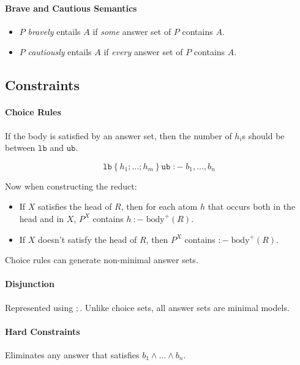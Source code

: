 \documentclass[twocolumn,english]{article}
\begin{document}
\paragraph{Brave and Cautious Semantics}
\begin{itemize}
\item $P$ \emph{bravely} entails $A$ if \emph{some} answer set of $P$
contains $A$.
\item $P$ \emph{cautiously} entails $A$ if \emph{every} answer set of
$P$ contains $A$.
\end{itemize}

\subsection{Constraints}

\paragraph{Choice Rules}

If the body is satisfied by an answer set, then the number of $h_{i}$s
should be between $\mathtt{lb}$ and $\mathtt{ub}$.

\[
\mathtt{lb}\left\{ h_{1};\dots;h_{m}\right\} \mathtt{ub}\;:-\;b_{1},\dots,b_{n}
\]

Now when constructing the reduct:
\begin{itemize}
\item If $X$ satisfies the head of $R$, then for each atom $h$ that occurs
both in the head and in $X$, $P^{X}$ contains $h\::-\;\text{body}^{+}\left(R\right)$.
\item If $X$ doesn't satisfy the head of $R$, then $P^{X}$ contains $:-\;\text{body}^{+}\left(R\right)$.
\end{itemize}
Choice rules can generate non-minimal answer sets.

\paragraph{Disjunction}

Represented using $;$. Unlike choice sets, all answer sets are minimal
models.

\paragraph{Hard Constraints}

Eliminates any answer that satisfies $b_{1}\land\dots\land b_{n}$.
\end{document}
